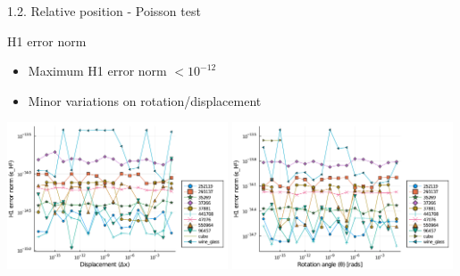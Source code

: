 \documentclass{beamer}
\begin{document}
\begin{frame}{1.2. Relative position - Poisson test}

  \begin{block}{H1 error norm}
  \begin{itemize}
    \item
      Maximum H1 error norm $< 10^{-12}$
    \item
      Minor variations on rotation/displacement
  \end{itemize}
  \end{block}

  \includegraphics[width=0.49\textwidth]{../analysis/plots/x_displacement_y_error_h1}
  \includegraphics[width=0.49\textwidth]{../analysis/plots/x_rotation_y_error_h1}
\end{frame}
\end{document}
